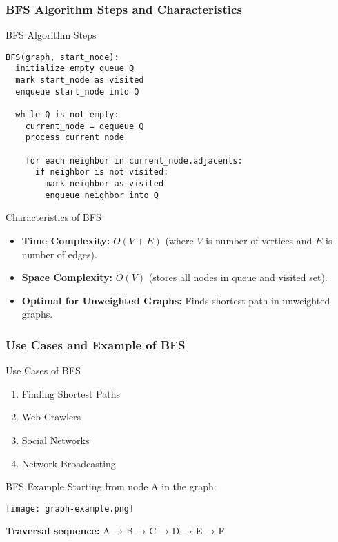 \documentclass[aspectratio=169]{beamer}
\begin{document}
\begin{frame}[fragile]
    \frametitle{BFS Algorithm Steps and Characteristics}
    \begin{block}{BFS Algorithm Steps}
    \begin{lstlisting}
BFS(graph, start_node):
  initialize empty queue Q
  mark start_node as visited
  enqueue start_node into Q

  while Q is not empty:
    current_node = dequeue Q
    process current_node

    for each neighbor in current_node.adjacents:
      if neighbor is not visited:
        mark neighbor as visited
        enqueue neighbor into Q
    \end{lstlisting}
    \end{block}

    \begin{block}{Characteristics of BFS}
        \begin{itemize}
            \item \textbf{Time Complexity:} $O(V + E)$ (where $V$ is number of vertices and $E$ is number of edges).
            \item \textbf{Space Complexity:} $O(V)$ (stores all nodes in queue and visited set).
            \item \textbf{Optimal for Unweighted Graphs:} Finds shortest path in unweighted graphs.
        \end{itemize}
    \end{block}
\end{frame}

\begin{frame}[fragile]
    \frametitle{Use Cases and Example of BFS}
    \begin{block}{Use Cases of BFS}
        \begin{enumerate}
            \item Finding Shortest Paths
            \item Web Crawlers
            \item Social Networks
            \item Network Broadcasting
        \end{enumerate}
    \end{block}

    \begin{block}{BFS Example}
        Starting from node A in the graph:
        
        \begin{center}
            \texttt{[image: graph-example.png]} %
        \end{center}
        
        \textbf{Traversal sequence:} A → B → C → D → E → F
    \end{block}
\end{frame}
\end{document}
